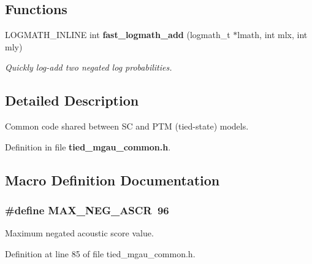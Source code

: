 \subsection*{Functions}
\begin{DoxyCompactItemize}
\item 
L\-O\-G\-M\-A\-T\-H\-\_\-\-I\-N\-L\-I\-N\-E int {\bf fast\-\_\-logmath\-\_\-add} (logmath\-\_\-t $\ast$lmath, int mlx, int mly)
\begin{DoxyCompactList}\small\item\em Quickly log-\/add two negated log probabilities. \end{DoxyCompactList}\end{DoxyCompactItemize}


\subsection{Detailed Description}
Common code shared between S\-C and P\-T\-M (tied-\/state) models. 

Definition in file {\bf tied\-\_\-mgau\-\_\-common.\-h}.



\subsection{Macro Definition Documentation}
\subsubsection[{M\-A\-X\-\_\-\-N\-E\-G\-\_\-\-A\-S\-C\-R}]{\setlength{\rightskip}{0pt plus 5cm}\#define M\-A\-X\-\_\-\-N\-E\-G\-\_\-\-A\-S\-C\-R~96}\label{tied__mgau__common_8h_a965d50d73044c3f2dc2589662fd2e89e}


Maximum negated acoustic score value. 



Definition at line 85 of file tied\-\_\-mgau\-\_\-common.\-h.

